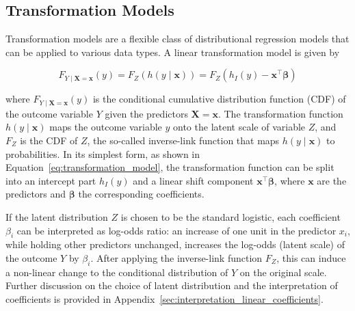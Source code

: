 \subsection{Transformation Models} \label{sec:trams}



Transformation models are a flexible class of distributional regression models that can be applied to various data types. A linear transformation model is given by

\begin{equation}
F_{Y \mid \mathbf{X}=\mathbf{x}}(y) = F_Z(h(y \mid \mathbf{x})) =  F_Z(h_I(y) - \mathbf{x}^\top \boldsymbol{\beta})
\label{eq:transformation_model}
\end{equation}

where $F_{Y \mid \mathbf{X}=\mathbf{x}}(y)$ is the conditional cumulative distribution function (CDF) of the outcome variable $Y$ given the predictors $\mathbf{X}=\mathbf{x}$. The transformation function $h(y \mid \mathbf{x})$ maps the outcome variable $y$ onto the latent scale of variable $Z$, and $F_Z$ is the CDF of $Z$, the so-called inverse-link function that maps $h(y \mid \mathbf{x})$ to probabilities. In its simplest form, as shown in Equation~\ref{eq:transformation_model}, the transformation function can be split into an intercept part $h_I(y)$ and a linear shift component $\mathbf{x}^\top \boldsymbol{\beta}$, where $\mathbf{x}$ are the predictors and $\boldsymbol{\beta}$ the corresponding coefficients.

If the latent distribution $Z$ is chosen to be the standard logistic, each coefficient $\beta_i$ can be interpreted as log-odds ratio: an increase of one unit in the predictor $x_i$, while holding other predictors unchanged, increases the log-odds (latent scale) of the outcome $Y$ by $\beta_i$. After applying the inverse-link function $F_Z$, this can induce a non-linear change to the conditional distribution of $Y$ on the original scale. Further discussion on the choice of latent distribution and the interpretation of coefficients is provided in Appendix~\ref{sec:interpretation_linear_coefficients}.


